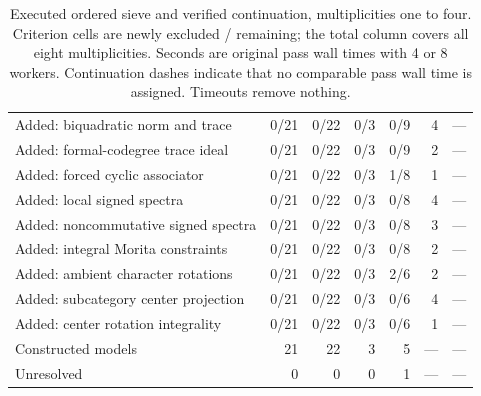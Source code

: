 \begin{table}[p]
\begin{tabular*}{\textwidth}{@{\extracolsep{\fill}}lrrrrrr@{}}
Added: biquadratic norm and trace & 0/21 & 0/22 & 0/3 & 0/9 & 4 & ---\\
Added: formal-codegree trace ideal & 0/21 & 0/22 & 0/3 & 0/9 & 2 & ---\\
Added: forced cyclic associator & 0/21 & 0/22 & 0/3 & 1/8 & 1 & ---\\
Added: local signed spectra & 0/21 & 0/22 & 0/3 & 0/8 & 4 & ---\\
Added: noncommutative signed spectra & 0/21 & 0/22 & 0/3 & 0/8 & 3 & ---\\
Added: integral Morita constraints & 0/21 & 0/22 & 0/3 & 0/8 & 2 & ---\\
Added: ambient character rotations & 0/21 & 0/22 & 0/3 & 2/6 & 2 & ---\\
Added: subcategory center projection & 0/21 & 0/22 & 0/3 & 0/6 & 4 & ---\\
Added: center rotation integrality & 0/21 & 0/22 & 0/3 & 0/6 & 1 & ---\\
\midrule
Constructed models & 21 & 22 & 3 & 5 & --- & ---\\
Unresolved & 0 & 0 & 0 & 1 & --- & ---\\
\bottomrule\end{tabular*}
\caption{Executed ordered sieve and verified continuation, multiplicities one to four. Criterion cells are newly excluded / remaining; the total column covers all eight multiplicities. Seconds are original pass wall times with 4 or 8 workers. Continuation dashes indicate that no comparable pass wall time is assigned. Timeouts remove nothing.}\label{tab:stages}
\end{table}
